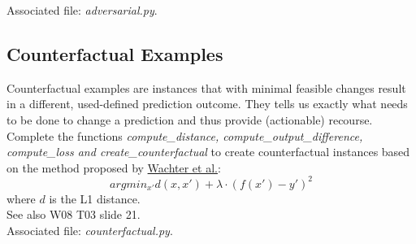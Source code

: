 \documentclass[a4paper]{article}
\begin{document}
\noindent Associated file: \textit{adversarial.py}.



\noindent
\subsection*{Counterfactual Examples}
Counterfactual examples are instances that with minimal feasible changes result in a different, used-defined prediction outcome.
They tells us exactly what needs to be done to change a prediction and thus provide (actionable) recourse.
Complete the functions \textit{compute\_distance, compute\_output\_difference, compute\_loss and create\_counterfactual} to create counterfactual instances based on the method proposed by \href{https://heinonline.org/HOL/Page?handle=hein.journals/hjlt31&div=29&g_sent=1&casa_token=b_RLJkzNRGAAAAAA:jUJgRUdjydLK2mc_I6JCXOjHj5M2HQfceDBdx2P5C9GXhy0k8fmfcnbsaF_clekNivbz8gBv}{Wachter et al.}:
\begin{equation}
    argmin_{x'}d(x, x') + \lambda \cdot (f(x') - y')^2
\end{equation}
where $d$ is the L1 distance.\\
\noindent
See also W08 T03 slide 21.
\\

\noindent Associated file: \textit{counterfactual.py}.
\end{document}
